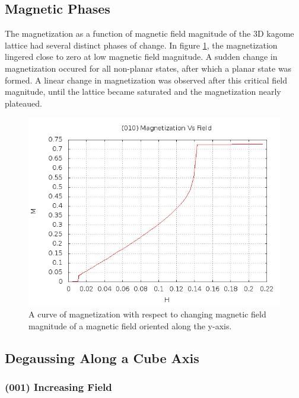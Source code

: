 \subsection{Magnetic Phases}

The magnetization as a function of magnetic field magnitude of the 3D kagome lattice had several distinct phases of change. In figure \ref{fig:magphase}, the magnetization lingered close to zero at low magnetic field magnitude. A sudden change in magnetization occured for all non-planar states, after which a planar state was formed. A linear change in magnetization was observed after this critical field magnitude, until the lattice became saturated and the magnetization nearly plateaued.

\begin{figure}
\includegraphics[scale=0.7]{img/magneticphases.png}
\caption{A curve of magnetization with respect to changing magnetic field magnitude of a magnetic field oriented along the y-axis.}
\label{fig:magphase}
\end{figure}

\subsection{Degaussing Along a Cube Axis}

\subsubsection{(001) Increasing Field}
